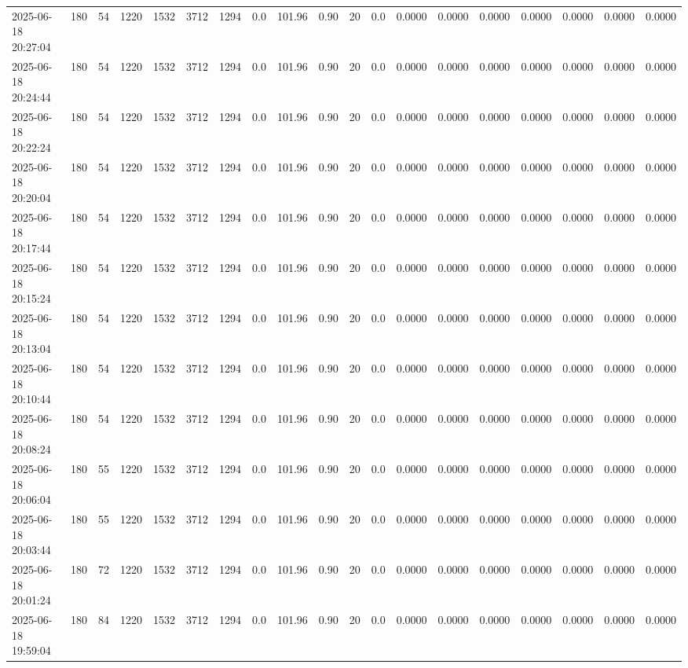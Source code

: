 \documentclass[UTF8,10pt,a4paper,fontset=fandol]{ctexart}
\begin{document}
{\begin{tabular}{|p{3.0cm}|*{18}{c|}}
2025-06-18 20:27:04 & 180 & 54 & 1220 & 1532 & 3712 & 1294 & 0.0 & 101.96 & 0.90 & 20 & 0.0 & 0.0000 & 0.0000 & 0.0000 & 0.0000 & 0.0000 & 0.0000 & 0.0000\\
2025-06-18 20:24:44 & 180 & 54 & 1220 & 1532 & 3712 & 1294 & 0.0 & 101.96 & 0.90 & 20 & 0.0 & 0.0000 & 0.0000 & 0.0000 & 0.0000 & 0.0000 & 0.0000 & 0.0000\\
2025-06-18 20:22:24 & 180 & 54 & 1220 & 1532 & 3712 & 1294 & 0.0 & 101.96 & 0.90 & 20 & 0.0 & 0.0000 & 0.0000 & 0.0000 & 0.0000 & 0.0000 & 0.0000 & 0.0000\\
2025-06-18 20:20:04 & 180 & 54 & 1220 & 1532 & 3712 & 1294 & 0.0 & 101.96 & 0.90 & 20 & 0.0 & 0.0000 & 0.0000 & 0.0000 & 0.0000 & 0.0000 & 0.0000 & 0.0000\\
2025-06-18 20:17:44 & 180 & 54 & 1220 & 1532 & 3712 & 1294 & 0.0 & 101.96 & 0.90 & 20 & 0.0 & 0.0000 & 0.0000 & 0.0000 & 0.0000 & 0.0000 & 0.0000 & 0.0000\\
2025-06-18 20:15:24 & 180 & 54 & 1220 & 1532 & 3712 & 1294 & 0.0 & 101.96 & 0.90 & 20 & 0.0 & 0.0000 & 0.0000 & 0.0000 & 0.0000 & 0.0000 & 0.0000 & 0.0000\\
2025-06-18 20:13:04 & 180 & 54 & 1220 & 1532 & 3712 & 1294 & 0.0 & 101.96 & 0.90 & 20 & 0.0 & 0.0000 & 0.0000 & 0.0000 & 0.0000 & 0.0000 & 0.0000 & 0.0000\\
2025-06-18 20:10:44 & 180 & 54 & 1220 & 1532 & 3712 & 1294 & 0.0 & 101.96 & 0.90 & 20 & 0.0 & 0.0000 & 0.0000 & 0.0000 & 0.0000 & 0.0000 & 0.0000 & 0.0000\\
2025-06-18 20:08:24 & 180 & 54 & 1220 & 1532 & 3712 & 1294 & 0.0 & 101.96 & 0.90 & 20 & 0.0 & 0.0000 & 0.0000 & 0.0000 & 0.0000 & 0.0000 & 0.0000 & 0.0000\\
2025-06-18 20:06:04 & 180 & 55 & 1220 & 1532 & 3712 & 1294 & 0.0 & 101.96 & 0.90 & 20 & 0.0 & 0.0000 & 0.0000 & 0.0000 & 0.0000 & 0.0000 & 0.0000 & 0.0000\\
2025-06-18 20:03:44 & 180 & 55 & 1220 & 1532 & 3712 & 1294 & 0.0 & 101.96 & 0.90 & 20 & 0.0 & 0.0000 & 0.0000 & 0.0000 & 0.0000 & 0.0000 & 0.0000 & 0.0000\\
2025-06-18 20:01:24 & 180 & 72 & 1220 & 1532 & 3712 & 1294 & 0.0 & 101.96 & 0.90 & 20 & 0.0 & 0.0000 & 0.0000 & 0.0000 & 0.0000 & 0.0000 & 0.0000 & 0.0000\\
2025-06-18 19:59:04 & 180 & 84 & 1220 & 1532 & 3712 & 1294 & 0.0 & 101.96 & 0.90 & 20 & 0.0 & 0.0000 & 0.0000 & 0.0000 & 0.0000 & 0.0000 & 0.0000 & 0.0000\\
\hline
\end{tabular}%
}
\end{document}
